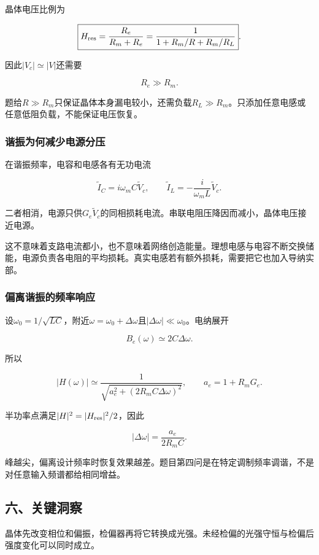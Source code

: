 \documentclass[12pt,a4paper,fontset=fandol]{ctexart}
\begin{document}
晶体电压比例为

\[
\boxed{
H_{\rm res}=\frac{R_e}{R_m+R_e}
=\frac1{1+R_m/R+R_m/R_L}}.
\]

因此\(|V_c|\simeq|V|\)还需要

\[
\boxed{R_e\gg R_m}.
\]

题给\(R\gg R_m\)只保证晶体本身漏电较小，还需负载\(R_L\gg R_m\)。只添加任意电感或任意低阻负载，不能保证电压恢复。

\subsubsection{谐振为何减少电源分压}\label{ux8c10ux632fux4e3aux4f55ux51cfux5c11ux7535ux6e90ux5206ux538b}

在谐振频率，电容和电感各有无功电流

\[
\widetilde I_C=i\omega_mC\widetilde V_c,\qquad
\widetilde I_L=-\frac{i}{\omega_mL}\widetilde V_c.
\]

二者相消，电源只供\(G_e\widetilde V_c\)的同相损耗电流。串联电阻压降因而减小，晶体电压接近电源。

这不意味着支路电流都小，也不意味着网络创造能量。理想电感与电容不断交换储能，电源负责各电阻的平均损耗。真实电感若有额外损耗，需要把它也加入导纳实部。

\subsubsection{偏离谐振的频率响应}\label{ux504fux79bbux8c10ux632fux7684ux9891ux7387ux54cdux5e94}

设\(\omega_0=1/\sqrt{LC}\)，附近\(\omega=\omega_0+\Delta\omega\)且\(|\Delta\omega|\ll\omega_0\)。电纳展开

\[
B_e(\omega)\simeq2C\Delta\omega.
\]

所以

\[
|H(\omega)|
\simeq
\frac1{\sqrt{a_e^2+(2R_mC\Delta\omega)^2}},
\qquad a_e=1+R_mG_e.
\]

半功率点满足\(|H|^2=|H_{\rm res}|^2/2\)，因此

\[
|\Delta\omega|=\frac{a_e}{2R_mC}.
\]

峰越尖，偏离设计频率时恢复效果越差。题目第四问是在特定调制频率调谐，不是对任意输入频谱都给相同增益。

\subsection{六、关键洞察}\label{ux516dux5173ux952eux6d1eux5bdf-7}

晶体先改变相位和偏振，检偏器再将它转换成光强。未经检偏的光强守恒与检偏后强度变化可以同时成立。
\end{document}
